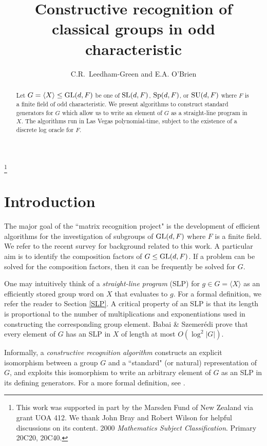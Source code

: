 \documentclass[12pt]{article}
\def\SL{{\rm SL}}
\def\GL{{\rm GL}}
\def\Sp{{\rm Sp}}
\def\SU{{\rm SU}}
\begin{document}
\title{Constructive recognition of classical groups in odd characteristic} 
\author{C.R.\ Leedham-Green and E.A. O'Brien}
\date{}
\maketitle

\begin{abstract}
Let $G = \langle X \rangle \leq \GL(d, F)$ be 
one of $\SL (d, F)$, $\Sp (d, F)$, or $\SU (d, F)$
where $F$ is a finite field of odd characteristic. 
We present algorithms to construct
standard generators for $G$ which allow us
to write an element of $G$ as a straight-line
program in $X$.  The algorithms run in Las Vegas polynomial-time, 
subject to the existence of a discrete log oracle for $F$. 
\end{abstract}

\footnote{This work was supported in part by the Marsden Fund of
New Zealand via grant UOA 412. We thank John Bray and Robert
Wilson for helpful discussions on its content.
2000 {\it Mathematics Subject Classification}.
Primary 20C20, 20C40.}

\section{Introduction}
\label{intro}

The major goal of the ``matrix recognition project"
is the development of efficient
algorithms for the investigation of 
subgroups of $\GL(d, F)$ where $F$ 
is a finite field. 
We refer to the recent survey \cite{OBrien05}
for background related to this work.
A particular aim is to 
identify the composition factors
of $G \leq \GL(d, F)$. If a problem
can be solved for the composition factors,
then it can be frequently be solved for $G$.

One may intuitively think of a {\it straight-line program} (SLP)
for $g \in G = \langle X \rangle$ as an efficiently stored group word
on $X$ that evaluates to $g$.  For a formal definition, we
refer the reader to Section \ref{SLP}.
A critical property of an SLP is 
that its length is proportional to the number of 
multiplications and exponentiations used in
constructing the corresponding group element. 
Babai \& Szemer{\'e}di \cite{BabaiSzemeredi84}
prove that every element of 
$G$ has an SLP in $X$ of length at most $O(\log^2|G|)$.

Informally, a {\it constructive recognition algorithm}
constructs an explicit isomorphism
between a group $G$ and a ``standard" (or natural)
representation of $G$, and exploits this isomorphism
to write an arbitrary element of $G$ as
an SLP in its defining generators. 
For a more formal definition, see \cite[p. 192]{Seress03}.
\end{document}
